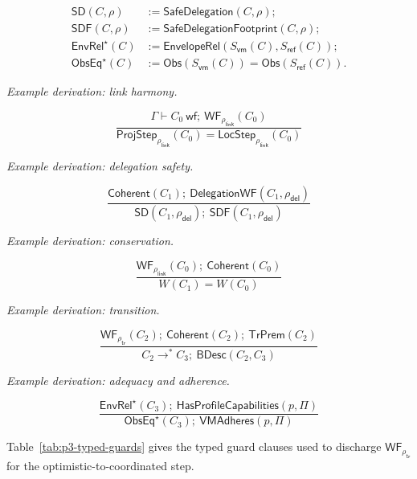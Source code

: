 \documentclass[a4paper,10pt,twocolumn,english]{article}
\numberwithin{equation}{section}
\theoremstyle{paperdef}
\theoremstyle{paperplain}
\theoremstyle{paperdef}
\theoremstyle{paperremark}
\theoremstyle{paperdef}
\newcommand{\Coherent}{\ensuremath{\mathsf{Coherent}}}
\newcommand{\EnvelopeRel}{\ensuremath{\mathsf{EnvelopeRel}}}
\newcommand{\Obs}{\ensuremath{\mathsf{Obs}}}
\newcommand{\ProjStep}[2]{\ensuremath{\mathsf{ProjStep}_{#2}(#1)}}
\newcommand{\LocStep}[2]{\ensuremath{\mathsf{LocStep}_{#2}(#1)}}
\newcommand{\VMAdheres}{\ensuremath{\mathsf{VMAdheres}}}
\newcommand{\HasProfileCapabilities}{\ensuremath{\mathsf{HasProfileCapabilities}}}
\newcommand{\wf}{\ensuremath{\mathsf{wf}}}
\newcommand{\eqnote}[1]{\par\noindent\textit{#1.}\par\vspace{2pt}}
\begin{document}
	{\small
		\begin{equation}
			\begin{aligned}
				\mathsf{SD}(C,\rho)        & := \mathsf{SafeDelegation}(C,\rho);                      \\
				\mathsf{SDF}(C,\rho)       & := \mathsf{SafeDelegationFootprint}(C,\rho);             \\
				\mathsf{EnvRel}^{\star}(C) & := \EnvelopeRel(S_{\mathsf{vm}}(C),S_{\mathsf{ref}}(C)); \\
				\mathsf{ObsEq}^{\star}(C)  & := \Obs(S_{\mathsf{vm}}(C))=\Obs(S_{\mathsf{ref}}(C)).
			\end{aligned}
		\end{equation}
	}
\eqnote{Example derivation: link harmony}
{\small
	\begin{equation}
		\dfrac{
		\Gamma \vdash C_0\ \wf;\ \mathsf{WF}_{\rho_{\mathsf{link}}}(C_0)
		}{
		\ProjStep{C_0}{\rho_{\mathsf{link}}}
		=
		\LocStep{C_0}{\rho_{\mathsf{link}}}
		}
	\end{equation}
}
\eqnote{Example derivation: delegation safety}
{\small
	\begin{equation}
		\dfrac{
			\Coherent(C_1);\ \mathsf{DelegationWF}(C_1,\rho_{\mathsf{del}})
		}{
			\mathsf{SD}(C_1,\rho_{\mathsf{del}});\ \mathsf{SDF}(C_1,\rho_{\mathsf{del}})
		}
	\end{equation}
}
\eqnote{Example derivation: conservation}
{\small
	\begin{equation}
		\dfrac{
		\mathsf{WF}_{\rho_{\mathsf{link}}}(C_0);\ \Coherent(C_0)
		}{
		W(C_1)=W(C_0)
		}
	\end{equation}
}
\eqnote{Example derivation: transition}
{\small
	\begin{equation}
		\dfrac{
		\mathsf{WF}_{\rho_{\mathsf{tr}}}(C_2);\ \Coherent(C_2);\ \mathsf{TrPrem}(C_2)
		}{
		C_2 \to^\ast C_3;\ \mathsf{BDesc}(C_2,C_3)
		}
	\end{equation}
}
\eqnote{Example derivation: adequacy and adherence}
{\small
	\begin{equation}
		\dfrac{
			\mathsf{EnvRel}^{\star}(C_3);\ \HasProfileCapabilities(p,\Pi)
		}{
			\mathsf{ObsEq}^{\star}(C_3);\ \VMAdheres(p,\Pi)
		}
	\end{equation}
}

Table~\ref{tab:p3-typed-guards} gives the typed guard clauses used to discharge $\mathsf{WF}_{\rho_{\mathsf{tr}}}$
for the optimistic-to-coordinated step.
\end{document}
